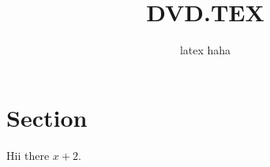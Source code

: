 \documentclass[11pt]{scrartcl}
\title{DVD.TEX}
\subtitle{latex haha}
\date{}
\begin{document}
\maketitle
\section{Section}
Hii there $x+2$.
\end{document}
